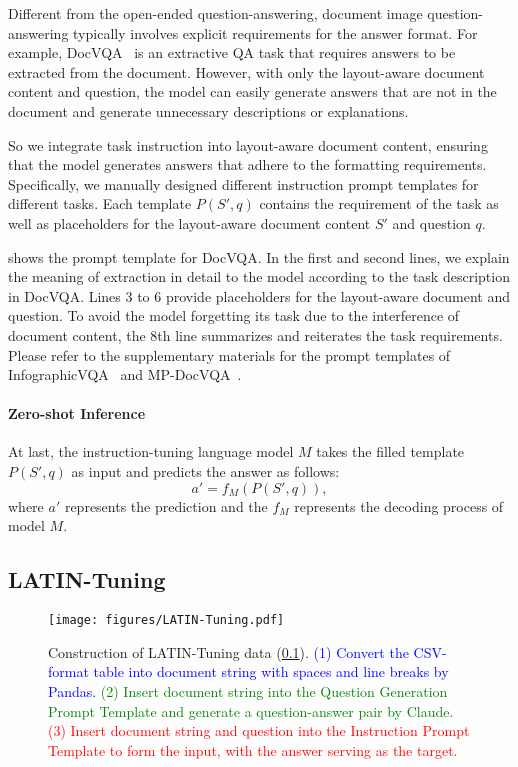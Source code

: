 \documentclass[letterpaper]{article} \usepackage{aaai24_preprint}  \usepackage{times}  \usepackage{helvet}  \usepackage{courier}  \usepackage[hyphens]{url}  \usepackage{graphicx} \urlstyle{rm} \def\UrlFont{\rm}  \usepackage{natbib}  \usepackage{caption} \frenchspacing  \setlength{\pdfpagewidth}{8.5in} \setlength{\pdfpageheight}{11in} \usepackage{algorithm}
\begin{document}
Different from the open-ended question-answering, document image question-answering typically involves explicit requirements for the answer format.
For example, DocVQA~\cite{mathewDocVQA2021} is an extractive QA task that requires answers to be extracted from the document.
However, with only the layout-aware document content and question, the model can easily generate answers that are not in the document and generate unnecessary descriptions or explanations.

So we integrate task instruction into layout-aware document content, ensuring that the model generates answers that adhere to the formatting requirements.
Specifically, we manually designed different instruction prompt templates for different tasks.
Each template $P(S',q)$ contains the requirement of the task as well as placeholders for the layout-aware document content $S'$ and question $q$.

 shows the prompt template for DocVQA.
In the first and second lines, we explain the meaning of extraction in detail to the model according to the task description in DocVQA.
Lines 3 to 6 provide placeholders for the layout-aware document and question.
To avoid the model forgetting its task due to the interference of document content, the 8th line summarizes and reiterates the task requirements.
Please refer to the supplementary materials for the prompt templates of InfographicVQA~\cite{mathewInfographicVQA2021} and MP-DocVQA~\cite{titoMulti-PageDocVQAHi-VT52023}.


\paragraph{Zero-shot Inference}
At last, the instruction-tuning language model $M$ takes the filled template $P(S',q)$ as input and predicts the answer as follows:
\begin{equation}
a'=f_{M}(P(S',q)),
\end{equation}
where $a'$ represents the prediction and the $f_{M}$ represents the decoding process of model $M$. 

\subsection{LATIN-Tuning}
\label{sec:latin-tuning}

\begin{figure}[t]
\centering
\small
\texttt{[image: figures/LATIN-Tuning.pdf]}
\caption{
Construction of LATIN-Tuning data (\cref{sec:latin-tuning}).
\textcolor{blue}{
(1) Convert the CSV-format table into document string with spaces and line breaks by Pandas.
}
\textcolor{green}{
(2) Insert document string into the Question Generation Prompt Template and generate a question-answer pair by Claude.
}
\textcolor{red}{
(3) Insert document string and question into the Instruction Prompt Template to form the input, with the answer serving as the target.
}
}
\label{fig:latin-tuning}
\end{figure}
\end{document}
